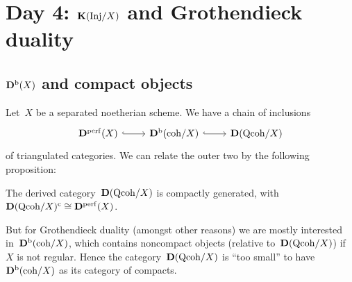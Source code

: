 \documentclass[10pt,a4paper]{article}
\begin{document}
\section{Day 4: \texorpdfstring{$\mathbf{K}(\mathrm{Inj}/X)$}{K(Inj/X)} and Grothendieck duality}
\subsection{\texorpdfstring{$\mathbf{D}^{\mathrm{b}}(X)$}{Db(X)} and compact objects}
Let~$X$ be a separated noetherian scheme. We have a chain of inclusions
\begin{equation}
  \begin{tikzcd}
    \derived^\perf(X) \arrow[hook]{r} & \derived^\bounded(\coh/X) \arrow[hook]{r} & \derived(\Qcoh/X)
  \end{tikzcd}
\end{equation}
of triangulated categories. We can relate the outer two by the following proposition:
\begin{proposition}
  The derived category~$\mathbf{D}(\mathrm{Qcoh}/X)$ is compactly generated, with $\mathbf{D}(\mathrm{Qcoh}/X)^{\mathrm{c}}\cong\mathbf{D}^{\mathrm{perf}}(X)$.
\end{proposition}

But for Grothendieck duality (amongst other reasons) we are mostly interested in~$\mathbf{D}^{\mathrm{b}}(\mathrm{coh}/X)$, which contains noncompact objects (relative to~$\mathbf{D}(\mathrm{Qcoh}/X)$) if~$X$ is not regular. Hence the category~$\mathbf{D}(\mathrm{Qcoh}/X)$ is ``too small'' to have~$\mathbf{D}^{\mathrm{b}}(\mathrm{coh}/X)$ as its category of compacts.
\end{document}
